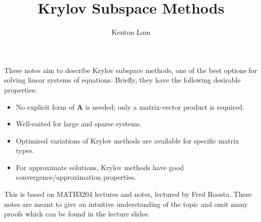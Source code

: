\documentclass[12pt,a4paper]{article} %
\title{Krylov Subspace Methods}
\author{Kenton Lam}
\begin{document}
\maketitle

These notes aim to describe Krylov subspace methods, 
one of the best options for solving linear systems of equations.
Briefly, they have the following desirable properties:
\begin{itemize}
    \item No explicit form of $\mathbf A$ is needed; only a matrix-vector product is required.
    \item Well-suited for large and sparse systems.
    \item Optimised variations of Krylov methods are available for specific matrix types.
    \item For approximate solutions, Krylov methods have good convergence/approximation properties.
\end{itemize}
This is based on MATH3204 lectures and notes, lectured by Fred Roosta. 
These notes are meant to give an intuitive understanding of the topic and 
omit many proofs which can be found in the lecture slides.

\newpage
\end{document}
